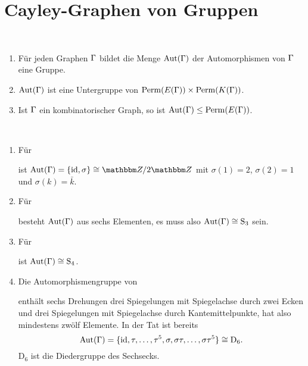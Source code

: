 
\section{Cayley-Graphen von Gruppen}\label{sec_cayley}

\BEM\
\begin{enumerate}
\item Für jeden Graphen $\Gamma$ bildet die Menge $\mathrm{Aut}(\Gamma)$ der
Automorphismen von $\Gamma$ eine Gruppe.
\item $\mathrm{Aut}(\Gamma)$ ist eine Untergruppe von
$\mathrm{Perm}(E(\Gamma)) \times \mathrm{Perm}(K(\Gamma))$.
\item Ist $\Gamma$ ein kombinatorischer Graph, so ist
$\mathrm{Aut}(\Gamma)\leq \mathrm{Perm}(E(\Gamma))$.
\end{enumerate}

\BSP\
\begin{enumerate}
\item Für
\begin{center}
\end{center}
ist $\Aut(\GR)=\{\id,\sigma\}\cong \ZZ/2\ZZ$ mit
$\sigma(1)=2$, $\sigma(2)=1$ und $\sigma(k)=\bar{k}$.
\item Für
\begin{center}
\end{center}
besteht $\mathrm{Aut}(\Gamma)$ aus sechs Elementen, es muss also
$\mathrm{Aut}(\Gamma)\cong \mathrm{S}_3$ sein.
\item Für
\begin{center}
\end{center}
ist $\mathrm{Aut}(\Gamma)\cong \mathrm{S}_4$.
\item Die Automorphismengruppe von
\begin{center}
\end{center}
enthält sechs Drehungen drei Spiegelungen mit Spiegelachse
durch zwei Ecken und drei Spiegelungen mit Spiegelachse durch
Kantemittelpunkte, hat also mindestens zwölf Elemente.
In der Tat ist bereits
\[
\mathrm{Aut}(\Gamma) = \{\mathrm{id},\tau,\ldots,\tau^5,
	\sigma,\sigma\tau,\ldots,\sigma \tau^5 \}
\cong \mathrm{D}_6.
\]
$\mathrm{D}_6$ ist die Diedergruppe des Sechsecks.
\end{enumerate}

